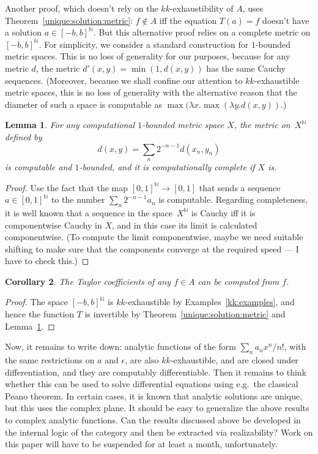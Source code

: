 \documentclass[10pt]{article}
\newtheorem{cor}{Corollary}[section]
\newtheorem{lemma}[cor]{Lemma}
\newcommand{\N}{\mathbb{N}}
\begin{document}
Another proof, which doesn't rely on the $kk$-exhaustibility of $A$,
uses Theorem~\ref{unique:solution:metric}: $f \not\in A$ iff the
equation $T(a)=f$ doesn't have a solution $a \in [-b,b]^\N$.  But this
alternative proof relies on a complete metric on $[-b,b]^\N$. For
simplicity, we consider a standard construction for $1$-bounded metric
spaces. This is no loss of generality for our purposes, because for
any metric $d$, the metric $d'(x,y)=\min(1,d(x,y))$ has the same
Cauchy sequences.  (Moreover, because we shall confine our attention
to $kk$-exhaustible metric spaces, this is no loss of generality with
the alternative reason that the diameter of such a space is computable
as $\max(\lambda x.\max(\lambda y.d(x,y))$.)

\begin{lemma} \label{product:metric} For any computational $1$-bounded
  metric space $X$, the metric on~$X^\N$ defined by
  \[
  d(x,y) = \sum_n 2^{-n-1} d(x_n,y_n) 
  \]
  is computable and $1$-bounded, and it is computationally complete if
  $X$ is.
\end{lemma}
\begin{proof}
  Use the fact that the map $[0,1]^\N \to [0,1]$ that sends a sequence
  $a \in [0,1]^\N$ to the number $\sum_n 2^{-n-1} a_n$ is computable.
  Regarding completeness, it is well known that a sequence in the
  space~$X^\N$ is Cauchy iff it is componentwise Cauchy in $X$, and in
  this case its limit is calculated componentwise. (To compute the
  limit componentwise, maybe we need suitable shifting to make sure
  that the components converge at the required speed --- I have to
  check this.)
\end{proof}

\begin{cor}
  The Taylor coefficients of any $f \in A$ can be
  computed from $f$.
\end{cor}
\begin{proof}
  The space $[-b,b]^\N$ is $kk$-exhaustible by
  Examples~\ref{kk:examples}, and hence the function $T$ is invertible
  by Theorem~\ref{unique:solution:metric} and
  Lemma~\ref{product:metric}.
\end{proof}

\medskip
Now, it remains to write down: analytic functions of the form $\sum_n a_n
x^n/n!$, with the same restrictions on $a$ and $\epsilon$, are also
$kk$-exhaustible, and are closed under differentiation, and they are
computably differentiable. Then it remains to think whether this can
be used to solve differential equations using e.g.\ the classical
Peano theorem.  In certain cases, it is known that analytic solutions
are unique, but this uses the complex plane. It should be easy to
generalize the above results to complex analytic functions. Can the
results discussed above be developed in the internal logic of the
category and then be extracted via realizability? Work on this paper will
have to be suspended for at least a month, unfortunately.

\pagebreak[3]
{%
  

}


\end{document}
